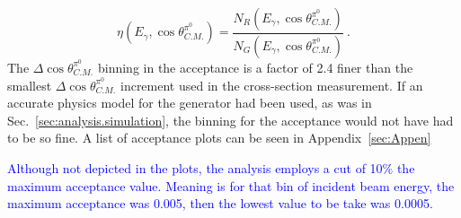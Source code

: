 \begin{equation}\label{eq:acceptance}
\eta(E_\gamma,\cos\theta^{\pi^0}_{C.M.}) = \frac{N_R(E_\gamma,\cos\theta^{\pi^0}_{C.M.})}{N_G(E_\gamma,\cos\theta^{\pi^0}_{C.M.})} \ .
\end{equation}
The $\Delta\cos\theta^{\pi^0}_{C.M.}$ binning in the acceptance is a factor of 2.4 finer than the smallest $\Delta\cos\theta^{\pi^0}_{C.M.}$ increment used in the cross-section measurement. If an accurate physics model for the generator had been used, as was in Sec.~\ref{sec:analysis.simulation}, the binning for the acceptance  would not have had to be so fine.
A list of acceptance plots can be seen in Appendix~\ref{sec:Appen} 

\textcolor{blue}{Although not depicted in the plots, the analysis employs a cut of 10\% the maximum acceptance value. Meaning is for that bin of incident beam energy, the maximum acceptance was 0.005, then the lowest value to be take was 0.0005.}